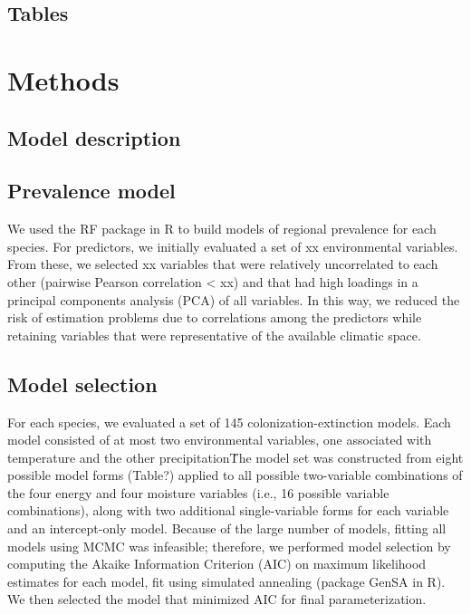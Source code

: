 \documentclass[11pt]{article}
\begin{document}
\subsection*{Tables}



\section*{Methods}

\subsection*{Model description}

\subsection*{Prevalence model}
We used the RF package in R to build models of regional prevalence for each species. 
For predictors, we initially evaluated a set of xx environmental variables. 
From these, we selected xx variables that were relatively uncorrelated to each other (pairwise Pearson correlation < xx) and that had high loadings in a principal components analysis (PCA) of all variables. 
In this way, we reduced the risk of estimation problems due to correlations among the predictors while retaining variables that were representative of the available climatic space.

\subsection*{Model selection}
For each species, we evaluated a set of 145 colonization-extinction models. 
Each model consisted of at most two environmental variables, one associated with temperature and the other precipitation\. 
The model set was constructed from eight possible model forms (Table?) applied to all possible two-variable combinations of the four energy and four moisture variables (i.e., 16 possible variable combinations), along with two additional single-variable forms for each variable and an intercept-only model. 
Because of the large number of models, fitting all models using MCMC was infeasible; therefore, we performed model selection by computing the Akaike Information Criterion (AIC) on maximum likelihood estimates for each model, fit using simulated annealing (package GenSA in R). 
We then selected the model that minimized AIC for final parameterization.
\end{document}
